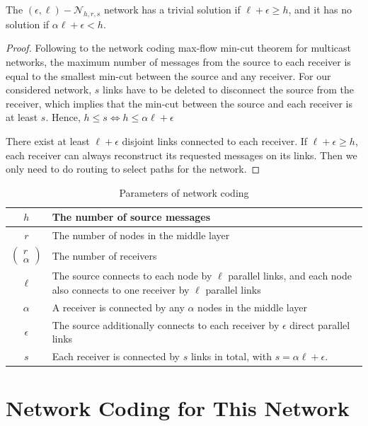 \begin{thm}
\label{nw_parameters}The $(\epsilon,\ell)-\mathcal{N}_{h,r,s}$
network has a trivial solution if $\ell+\epsilon\geq h$, and it has
no solution if $\alpha\ell+\epsilon<h$.
\end{thm}
\begin{proof}
Following to the network coding max-flow min-cut theorem for multicast
networks, the maximum number of messages from the source to each receiver
is equal to the smallest min-cut between the source and any receiver.
For our considered network, $s$ links have to be deleted to disconnect
the source from the receiver, which implies that the min-cut between
the source and each receiver is at least $s$. Hence, $h\leq s\Leftrightarrow h\leq\alpha\ell+\epsilon$ 

There exist at least $\ell+\epsilon$ disjoint links connected to
each receiver. If $\ell+\epsilon\geq h$, each receiver can always
reconstruct its requested messages on its links. Then we only need
to do routing to select paths for the network.
\end{proof}
\begin{table}[H]
\caption{Parameters of network coding \label{tab:Parameters-of-network}}

\centering{}%
\begin{tabular}{c|>{\centering}p{0.48\paperwidth}}
$h$ & The number of source messages\tabularnewline
\hline 
$r$ & The number of nodes in the middle layer\tabularnewline
\hline 
$\left(\begin{array}{c}
r\\
\alpha
\end{array}\right)$ & The number of receivers\tabularnewline
\hline 
$\ell$ & The source connects to each node by $\ell$ parallel links, and each
node also connects to one receiver by $\ell$ parallel links\tabularnewline
\hline 
$\alpha$ & A receiver is connected by any $\alpha$ nodes in the middle layer\tabularnewline
\hline 
$\epsilon$ & The source additionally connects to each receiver by $\epsilon$ direct
parallel links\tabularnewline
\hline 
$s$ & Each receiver is connected by $s$ links in total, with $s=\alpha\ell+\epsilon$.\tabularnewline
\end{tabular}
\end{table}


\section{Network Coding for This Network \label{sec:Network-Coding-for-GCN}}

